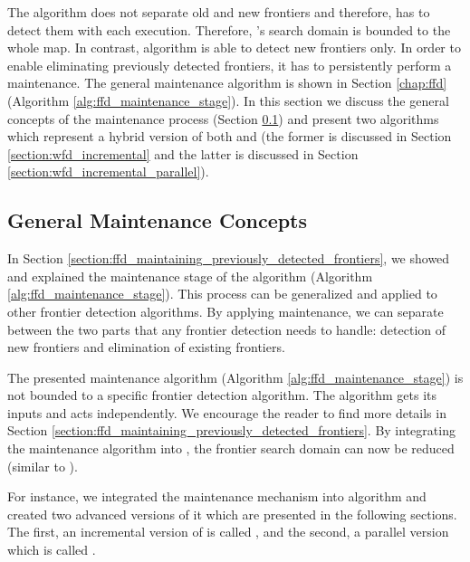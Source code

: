 The \WFD algorithm does not separate old and new frontiers and 
therefore, has to detect them with each execution. Therefore, \WFD's search
domain is bounded to the whole map. In contrast, \FFD algorithm is able to detect new frontiers
only. In order to enable \FFD eliminating previously detected frontiers, it has
to persistently perform a maintenance. 
The general maintenance algorithm is shown in Section \ref{chap:ffd} (Algorithm
\ref{alg:ffd_maintenance_stage}). In this
section we discuss the general concepts of the maintenance process
(Section \ref{section:general_maintenenace_concepts}) and present two
algorithms which represent a hybrid version of both \WFD and \FFD (the
former is discussed in Section \ref{section:wfd_incremental} and the
latter is discussed in Section \ref{section:wfd_incremental_parallel}).

\subsection{General Maintenance Concepts}
\label{section:general_maintenenace_concepts}

In Section \ref{section:ffd_maintaining_previously_detected_frontiers}, we
showed and explained the maintenance stage of the \FFD algorithm (Algorithm
\ref{alg:ffd_maintenance_stage}). This process can be generalized
and applied to other frontier detection algorithms. By applying maintenance, we
can separate between the two parts that any frontier detection needs to handle:
detection of new frontiers and elimination of existing frontiers. 

The presented maintenance algorithm (Algorithm \ref{alg:ffd_maintenance_stage})
is not bounded to a specific frontier detection algorithm. The algorithm gets
its inputs and acts independently. We encourage the reader
to find more details in Section
\ref{section:ffd_maintaining_previously_detected_frontiers}.
By integrating the maintenance algorithm into \WFD, the frontier search domain
can now be reduced (similar to \FFD). 
%

For instance, we integrated the maintenance mechanism into \WFD
algorithm and created two advanced versions of it which are presented in the
following sections. The first, an incremental version of \WFD is called
\WFDINC, and the second, a parallel version which is called \WFDIP.

